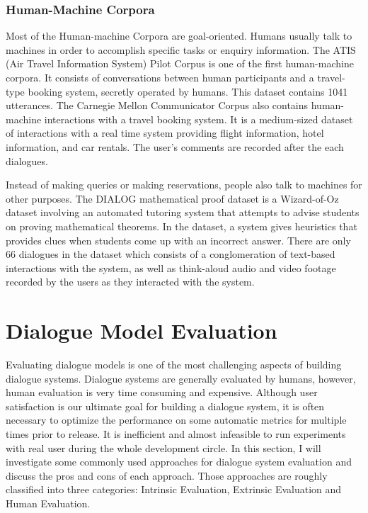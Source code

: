 \documentclass[bsc,frontabs,twoside,singlespacing,parskip,deptreport]{infthesis}     %
\begin{document}
\subsubsection{Human-Machine Corpora}

Most of the Human-machine Corpora are goal-oriented. Humans usually talk to machines in order to accomplish specific tasks or enquiry information. The ATIS (Air Travel Information System) Pilot Corpus\cite{hemphill1990atis} is one of the first human-machine corpora. It consists of conversations between human participants and a travel-type booking system, secretly operated by humans. This dataset contains 1041 utterances. The Carnegie Mellon Communicator Corpus\cite{bennett2002carnegie} also contains human-machine interactions with a travel booking system. It is a medium-sized dataset of interactions with a real time system providing flight information, hotel information, and car rentals. The user’s comments are recorded after the each dialogues.

Instead of making queries or making reservations, people also talk to machines for other purposes. The DIALOG mathematical proof dataset\cite{wolska2004annotated} is a Wizard-of-Oz dataset involving an automated tutoring system that attempts to advise students on proving mathematical theorems. In the dataset, a system gives heuristics that provides clues when students come up with an incorrect answer. There are only 66 dialogues in the dataset which consists of a conglomeration of text-based interactions with the system, as well as think-aloud audio and video footage recorded by the users as they interacted with the system. 


\section{Dialogue Model Evaluation}

Evaluating dialogue models is one of the most challenging aspects of building dialogue systems. Dialogue systems are generally evaluated by humans, however, human evaluation is very time consuming and expensive. Although user satisfaction is our ultimate goal for building a dialogue system, it is often necessary to optimize the performance on some automatic metrics for multiple times prior to release. It is inefficient and almost infeasible to run experiments with real user during the whole development circle. In this section, I will investigate some commonly used approaches for dialogue system evaluation and discuss the pros and cons of each approach. Those approaches are roughly classified into three categories: Intrinsic Evaluation, Extrinsic Evaluation and Human Evaluation.
\end{document}
